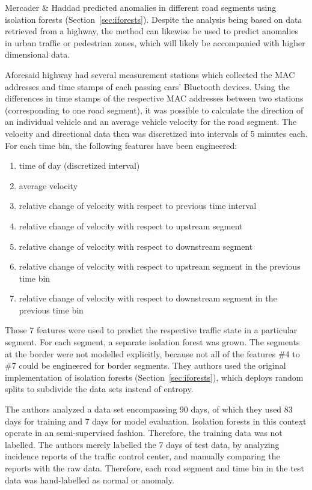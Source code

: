 \documentclass[conference]{IEEEtran}
\begin{document}
Mercader \& Haddad \cite{mercader2020automatic} predicted anomalies in different road segments using isolation forests (Section~\ref{sec:iforests}). Despite the analysis being based on data retrieved from a highway, the method can likewise be used to predict anomalies in urban traffic or pedestrian zones, which will likely be accompanied with higher dimensional data.

Aforesaid highway had several measurement stations which collected the MAC addresses and time stamps of each passing cars' Bluetooth devices. Using the differences in time stamps of the respective MAC addresses between two stations (corresponding to one road segment), it was possible to calculate the direction of an individual vehicle and an average vehicle velocity for the road segment. The velocity and directional data then was discretized into intervals of 5 minutes each. For each time bin, the following features have been engineered:
\begin{enumerate}
    \item time of day (discretized interval)
    \item average velocity
    \item relative change of velocity with respect to previous time interval
    \item relative change of velocity with respect to upstream segment
    \item relative change of velocity with respect to downstream segment
    \item relative change of velocity with respect to upstream segment in the previous time bin
    \item relative change of velocity with respect to downstream segment in the previous time bin
\end{enumerate}

Those 7 features were used to predict the respective traffic state in a particular segment. For each segment, a separate isolation forest was grown. The segments at the border were not modelled explicitly, because not all of the features \#4 to \#7 could be engineered for border segments. They authors used the original implementation of isolation forests (Section~\ref{sec:iforests}), which deploys random splits to subdivide the data sets instead of entropy.

The authors analyzed a data set encompassing 90 days, of which they used 83 days for training and 7 days for model evaluation. Isolation forests in this context operate in an semi-supervised fashion. Therefore, the training data was not labelled. The authors merely labelled the 7 days of test data, by analyzing incidence reports of the traffic control center, and manually comparing the reports with the raw data. Therefore, each road segment and time bin in the test data was hand-labelled as normal or anomaly. 
\end{document}
